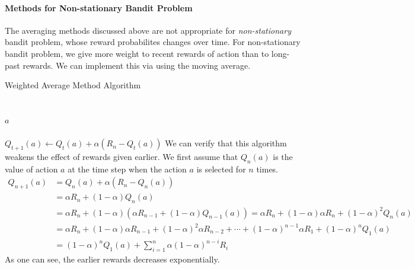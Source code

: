 \documentclass[../../main.tex]{subfiles}
\begin{document}
            \paragraph{Methods for Non-stationary Bandit Problem}
            
            The averaging methods discussed above are not appropriate for \emph{non-stationary} bandit problem, whose reward probabilites changes over time.
            For non-stationary bandit problem, we give more weight to recent rewards of action than to long-past rewards. We can implement this via using the moving average.
            
            {Weighted Average Method Algorithm}
            {
                \\
                \\
                \\
                $a$\\
                \\
                \inputitem{$\alpha \in (0,1]$}{constant step size}
            }
            {
            }
            {
                $Q_{t+1}(a) \leftarrow Q_t(a) + \alpha(R_n - Q_t(a))$\;
            }
            We can verify that this algorithm weakens the effect of rewards given earlier. We first assume that $Q_n(a)$ is the value of action $a$
            at the time step when the action $a$ is selected for $n$ times. 
            \begin{align*}
                Q_{n+1}(a) &= Q_n(a) + \alpha(R_n - Q_n(a)) \\
                &= \alpha R_n + (1-\alpha)Q_n(a) \\
                &= \alpha R_n + (1-\alpha)(\alpha R_{n-1} + (1-\alpha)Q_{n-1}(a)) = \alpha R_n + (1-\alpha)\alpha R_n + (1-\alpha)^2Q_n(a) \\
                &= \alpha R_n + (1-\alpha)\alpha R_{n-1} + (1-\alpha)^2\alpha R_{n-2} + \cdots + (1-\alpha)^{n-1}\alpha R_1 + (1-\alpha)^n Q_1(a) \\
                &= (1-\alpha)^n Q_1(a) + \sum_{i=1}^{n}\alpha(1-\alpha)^{n-i}R_i
            \end{align*}
            As one can see, the earlier rewards decreases exponentially.
\end{document}
